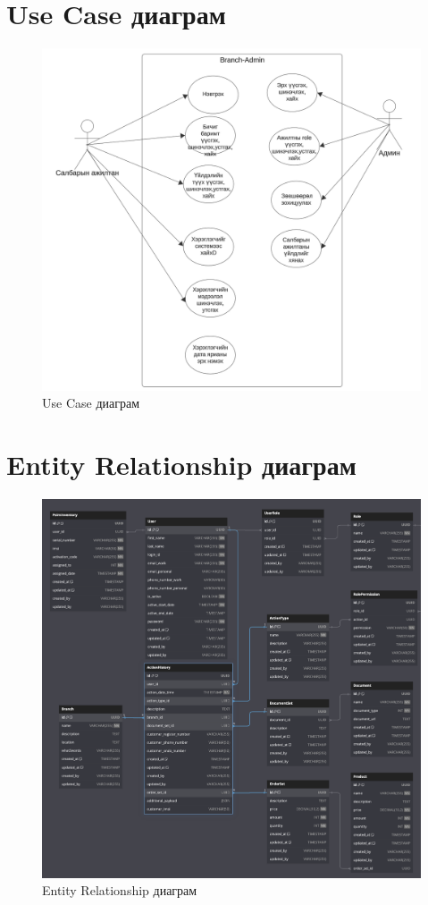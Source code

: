 \pagebreak

\section{Use Case диаграм}
\begin{figure}[h!]
	\centering
	\includegraphics[width=15cm]{images/usecase-diagram.png}
	\caption{Use Case диаграм}
	\label{fig:usecase-image}
\end{figure}
\pagebreak

\section{Entity Relationship диаграм}
\begin{figure}[h!]
	\centering
	\includegraphics[width=15cm]{images/er-diagram.png}
	\caption{Entity Relationship диаграм}
	\label{fig:er-image}
\end{figure}